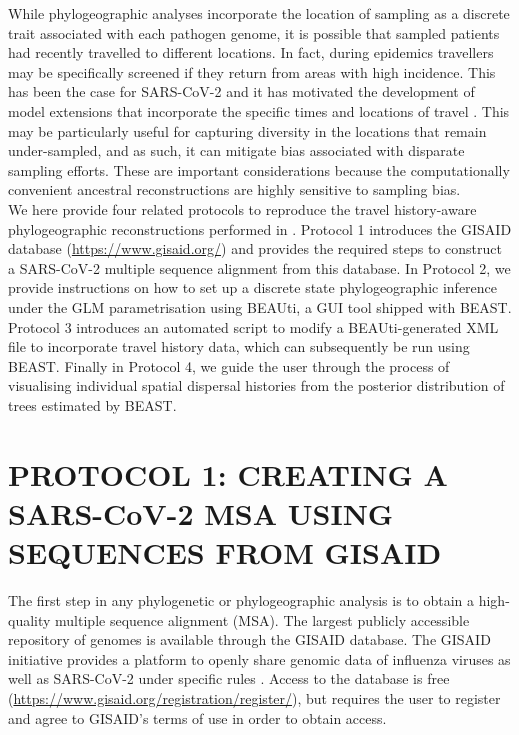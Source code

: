 \documentclass{article}
\begin{document}
While phylogeographic analyses incorporate the location of sampling as a discrete trait associated with each pathogen genome, it is possible that sampled patients had recently travelled to different locations. 
In fact, during epidemics travellers may be specifically screened if they return from areas with high incidence. This has been the case for SARS-CoV-2 and it has motivated the development of model extensions that incorporate the specific times and locations of travel \cite{travhist}. This may be particularly useful for capturing diversity in the locations that remain under-sampled, and as such, it can mitigate bias associated with disparate sampling efforts. 
These are important considerations because the computationally convenient ancestral reconstructions are highly sensitive to sampling bias. \\


We here provide four related protocols to reproduce the travel history-aware phylogeographic reconstructions performed in \cite{travhist}.
Protocol 1 introduces the GISAID database \cite{gisaid} (\url{https://www.gisaid.org/}) and provides the required steps to construct a SARS-CoV-2 multiple sequence alignment from this database.
In Protocol 2, we provide instructions on how to set up a discrete state phylogeographic inference under the GLM parametrisation using BEAUti, a GUI tool shipped with BEAST.
Protocol 3 introduces an automated script to modify a BEAUti-generated XML file to incorporate travel history data, which can subsequently be run using BEAST.
Finally in Protocol 4, we guide the user through the process of visualising individual spatial dispersal histories from the posterior distribution of trees estimated by BEAST.


\section*{PROTOCOL 1: CREATING A SARS-CoV-2 MSA USING SEQUENCES FROM GISAID}

The first step in any phylogenetic or phylogeographic analysis is to obtain a high-quality multiple sequence alignment (MSA).
The largest publicly accessible repository of genomes is available through the GISAID database.
The GISAID initiative provides a platform to openly share genomic data of influenza viruses as well as SARS-CoV-2 under specific rules \cite{gisaid}.
Access to the database is free (\url{https://www.gisaid.org/registration/register/}), but requires the user to register and agree to GISAID's terms of use in order to obtain access.\\
\end{document}
